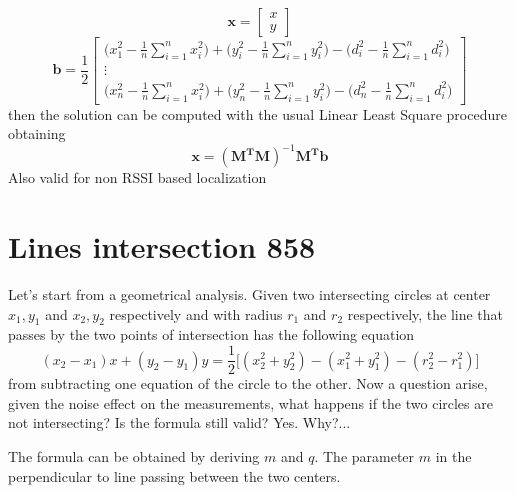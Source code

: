 \documentclass[12pt,twoside]{report}
\begin{document}
$$
\mathbf{x}=\begin{bmatrix}
    x\\
    y
\end{bmatrix}
$$
$$\mathbf{b}=\frac{1}{2}
\begin{bmatrix}
\bigg(x_1^2-\frac{1}{n}\sum_{i=1}^nx^2_i\bigg)+\bigg(y_i^2-\frac{1}{n}\sum_{i=1}^ny^2_i\bigg)-\bigg(d_i^2-\frac{1}{n}\sum_{i=1}^nd_i^2\bigg)\\
\vdots\\
\bigg(x_n^2-\frac{1}{n}\sum_{i=1}^nx^2_i\bigg)+\bigg(y_n^2-\frac{1}{n}\sum_{i=1}^ny^2_i\bigg)-\bigg(d_n^2-\frac{1}{n}\sum_{i=1}^nd_i^2\bigg)
\end{bmatrix}
$$
then the solution can be computed with the usual Linear Least Square procedure obtaining
\begin{equation}
    \mathbf{x}=(\mathbf{M^TM})^{-1}\mathbf{M^Tb}
\end{equation}
Also valid for non RSSI based localization
\clearpage


\section{Lines intersection 858}
Let's start from a geometrical analysis. Given two intersecting circles at center $x_{1},y_{1}$ and $x_{2},y_{2}$ respectively and with radius $r_1$ and $r_2$ respectively, the line that passes by the two points of intersection has the following equation
\begin{equation}
    (x_2-x_1)x+(y_2-y_1)y=\frac{1}{2}\big[(x_2^2+y_2^2)-(x_1^2+y_1^2)-(r_2^2-r_1^2)\big]
\end{equation}
from subtracting one equation of the circle to the other. Now a question arise, given the noise effect on the measurements, what happens if the two circles are not intersecting? Is the formula still valid? Yes. Why?... 

The formula can be obtained by deriving $m$ and $q$. The parameter $m$ in the perpendicular to line passing between the two centers.
\end{document}
